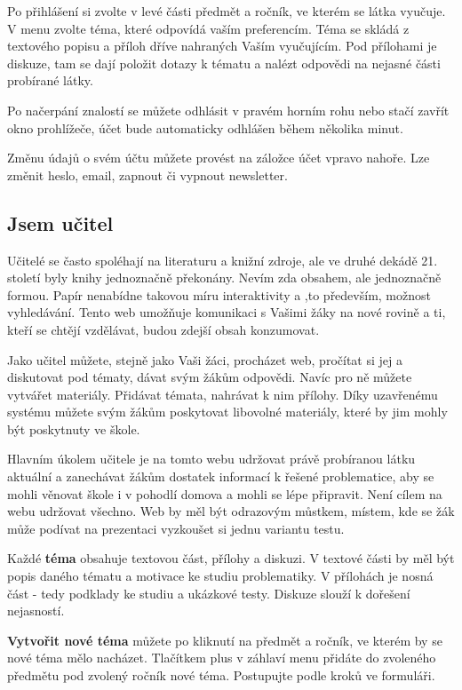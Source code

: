 \documentclass[thesis=B,czech]{FITthesis}[2012/06/26]
\begin{document}
Po přihlášení si zvolte v levé části předmět a ročník, ve kterém se látka vyučuje. V menu zvolte téma, které odpovídá vaším preferencím. Téma se skládá z textového popisu a příloh dříve nahraných Vaším vyučujícím. Pod přílohami je diskuze, tam se dají položit dotazy k tématu a nalézt odpovědi na nejasné části probírané látky.

Po načerpání znalostí se můžete odhlásit v pravém horním rohu nebo stačí zavřít okno prohlížeče, účet bude automaticky odhlášen během několika minut.

Změnu údajů o svém účtu můžete provést na záložce účet vpravo nahoře. Lze změnit heslo, email, zapnout či vypnout newsletter.

\subsection{Jsem učitel}

Učitelé se často spoléhají na literaturu a knižní zdroje, ale ve druhé dekádě 21. století byly knihy jednoznačně překonány. Nevím zda obsahem, ale jednoznačně formou. Papír nenabídne takovou míru interaktivity a ,to především, možnost vyhledávání. Tento web umožňuje komunikaci s Vašimi žáky na nové rovině a ti, kteří se chtějí vzdělávat, budou zdejší obsah konzumovat.

Jako učitel můžete, stejně jako Vaši žáci, procházet web, pročítat si jej a diskutovat pod tématy, dávat svým žákům odpovědi. Navíc pro ně můžete vytvářet materiály. Přidávat témata, nahrávat k nim přílohy. Díky uzavřenému systému můžete svým žákům poskytovat libovolné materiály, které by jim mohly být poskytnuty ve škole.

Hlavním úkolem učitele je na tomto webu udržovat právě probíranou látku aktuální a zanechávat žákům dostatek informací k řešené problematice, aby se mohli věnovat škole i v pohodlí domova a mohli se lépe připravit. Není cílem na webu udržovat všechno. Web by měl být odrazovým můstkem, místem, kde se žák může podívat na prezentaci vyzkoušet si jednu variantu testu.

Každé \textbf{téma} obsahuje textovou část, přílohy a diskuzi. V textové části by měl být popis daného tématu a motivace ke studiu problematiky. V přílohách je nosná část - tedy podklady ke studiu a ukázkové testy. Diskuze slouží k dořešení nejasností.

\textbf{Vytvořit nové téma} můžete po kliknutí na předmět a ročník, ve kterém by se nové téma mělo nacházet. Tlačítkem plus v záhlaví menu přidáte do zvoleného předmětu pod zvolený ročník nové téma. Postupujte podle kroků ve formuláři.
\end{document}
